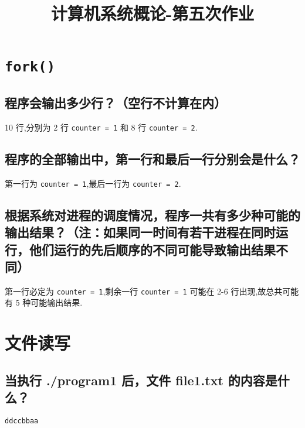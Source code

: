 
\usepackage{../../homeworks_preamble}
\title{计算机系统概论-第五次作业}


    \maketitle
    \section{\texttt{fork()}}   
    \subsection{程序会输出多少行？（空行不计算在内）}
    10 行,分别为 2 行 \texttt{counter = 1} 和 8 行 \texttt{counter = 2}.
    \subsection{程序的全部输出中，第一行和最后一行分别会是什么？}
    第一行为 \texttt{counter = 1},最后一行为 \texttt{counter = 2}.
    \subsection{根据系统对进程的调度情况，程序一共有多少种可能的输出结果？（注：如果同一时间有若干进程在同时运行，他们运行的先后顺序的不同可能导致输出结果不同）}
    第一行必定为 \texttt{counter = 1},剩余一行 \texttt{counter = 1} 可能在 2-6 行出现,故总共可能有 5 种可能输出结果.
    \section{文件读写}
    \subsection{当执行 ./program1 后，文件 file1.txt 的内容是什么？}
    \texttt{ddccbbaa}
